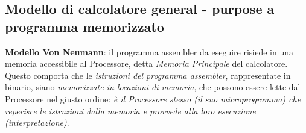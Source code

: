 \subsection{Modello di calcolatore general - purpose a programma memorizzato}

\textbf{Modello Von Neumann}: il programma assembler da eseguire risiede in una memoria accessibile al Processore, detta \textit{Memoria Principale} del calcolatore. Questo comporta che le \textit{istruzioni del programma assembler}, rappresentate in binario, siano \textit{memorizzate in locazioni di memoria}, che possono essere lette dal Processore nel giusto ordine: \textit{è il Processore stesso (il suo microprogramma) che reperisce le istruzioni dalla memoria e provvede alla loro esecuzione (interpretazione)}.
